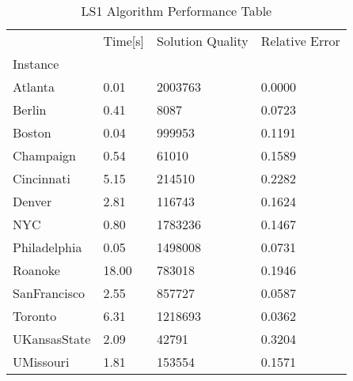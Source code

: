 \begin{table}[htpb]
\caption{ LS1 Algorithm Performance Table }
\begin{tabular}{llll}
\toprule
{} & Time[s] & Solution Quality & Relative Error \\
Instance     &         &                  &                \\
\midrule
Atlanta      &    0.01 &          2003763 &         0.0000 \\
Berlin       &    0.41 &             8087 &         0.0723 \\
Boston       &    0.04 &           999953 &         0.1191 \\
Champaign    &    0.54 &            61010 &         0.1589 \\
Cincinnati   &    5.15 &           214510 &         0.2282 \\
Denver       &    2.81 &           116743 &         0.1624 \\
NYC          &    0.80 &          1783236 &         0.1467 \\
Philadelphia &    0.05 &          1498008 &         0.0731 \\
Roanoke      &   18.00 &           783018 &         0.1946 \\
SanFrancisco &    2.55 &           857727 &         0.0587 \\
Toronto      &    6.31 &          1218693 &         0.0362 \\
UKansasState &    2.09 &            42791 &         0.3204 \\
UMissouri    &    1.81 &           153554 &         0.1571 \\
\bottomrule
\end{tabular}
\end{table}
